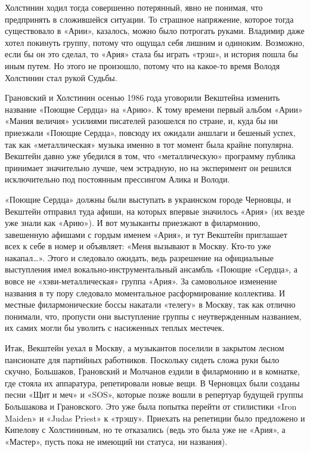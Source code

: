 \documentclass[16pt,a5paper,oneside]{book}
\begin{document}
Холстинин ходил тогда совершенно потерянный, явно не понимая, что предпринять в сложившейся ситуации. То страшное
напряжение, которое тогда существовало в «Арии», казалось, можно было потрогать руками. Владимир даже хотел покинуть
группу, потому что ощущал себя лишним и одиноким. Возможно, если бы он это сделал, то «Ария» стала бы играть «трэш», и
история пошла бы иным путем. Но этого не произошло, потому что на какое-то время Володя Холстинин стал рукой Судьбы.

 Грановский и Холстинин осенью 1986 года уговорили Векштейна изменить название «Поющие Сердца» на «Арию». К
тому времени первый альбом «Арии» «Мания величия» усилиями писателей разошелся по стране, и, куда бы ни приезжали
«Поющие Сердца», повсюду их ожидали аншлаги и бешеный успех, так как «металлическая» музыка именно в тот момент была
крайне популярна. Векштейн давно уже убедился в том, что «металлическую» программу публика принимает значительно лучше,
чем эстрадную, но на эксперимент он решился исключительно под постоянным прессингом Алика и Володи.

«Поющие Сердца» должны были выступать в украинском городе Черновцы, и Векштейн отправил туда афиши, на которых впервые
значилось «Ария» (их везде уже знали как «Арию»). И вот музыканты приезжают в филармонию, завешенную афишами с гордым
именем «Ария», и тут Векштейн приглашает всех к себе в номер и объявляет: «Меня вызывают в Москву. Кто-то уже
накапал\ldots». Этого и следовало ожидать, ведь разрешение на официальные выступления имел вокально-инструментальный
ансамбль «Поющие «Сердца», а вовсе не «хэви-металлическая» группа «Ария». За самовольное изменение названия в ту пору
следовало моментальное расформирование коллектива. И местные филармонические боссы накатали «телегу» в Москву, так как
отлично понимали, что, пропусти они выступление группы с неутвержденным названием, их самих могли бы уволить с
насиженных теплых местечек.

Итак, Векштейн уехал в Москву, а музыкантов поселили в закрытом лесном пансионате для партийных работников. Поскольку
сидеть сложа руки было скучно, Большаков, Грановский и Молчанов ездили в филармонию и в комнатке, где стояла их
аппаратура, репетировали новые вещи. В Черновцах были созданы песни «Щит и меч» и «SOS», которые позже вошли в репертуар
будущей группы Большакова и Грановского. Это уже была попытка перейти от стилистики «Iron Maiden» и «Judas Priest» к
«трэшу». Приехать на репетиции было предложено и Кипелову с Холстининым, но те отказались (ведь это была уже не «Ария»,
а «Мастер», пусть пока не имеющий ни статуса, ни названия).
\end{document}
